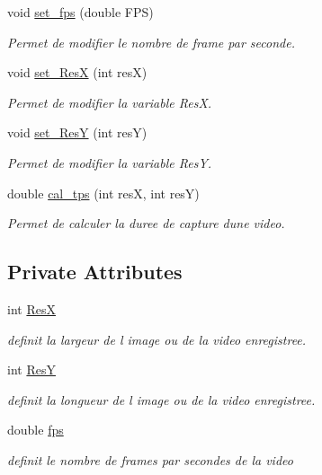 \begin{DoxyCompactItemize}
void \hyperlink{classCapture_a16b9a470b73f5ff71e133ceaa861aeca}{set\+\_\+fps} (double F\+PS)
\begin{DoxyCompactList}\small\item\em Permet de modifier le nombre de frame par seconde. \end{DoxyCompactList}\item 
void \hyperlink{classCapture_ac521361beb13f870b235df51b02e4129}{set\+\_\+\+ResX} (int resX)
\begin{DoxyCompactList}\small\item\em Permet de modifier la variable ResX. \end{DoxyCompactList}\item 
void \hyperlink{classCapture_a7f70eda8e57772e14d04cd55e116ee77}{set\+\_\+\+ResY} (int resY)
\begin{DoxyCompactList}\small\item\em Permet de modifier la variable ResY. \end{DoxyCompactList}\item 
double \hyperlink{classCapture_a9ebad63e310f50a14a9ef2e08254a5c6}{cal\+\_\+tps} (int resX, int resY)
\begin{DoxyCompactList}\small\item\em Permet de calculer la duree de capture d\textquotesingle{}une video. \end{DoxyCompactList}\end{DoxyCompactItemize}
\subsection*{Private Attributes}
\begin{DoxyCompactItemize}
\item 
int \hyperlink{classCapture_aa210af994a7df17b80392adc91103b7f}{ResX}
\begin{DoxyCompactList}\small\item\em definit la largeur de l image ou de la video enregistree. \end{DoxyCompactList}\item 
int \hyperlink{classCapture_a5075c034c091f4c0ab84ddc10b56cd6c}{ResY}
\begin{DoxyCompactList}\small\item\em definit la longueur de l image ou de la video enregistree. \end{DoxyCompactList}\item 
double \hyperlink{classCapture_a295749772bc738a4f2f0a6c6976474d1}{fps}
\begin{DoxyCompactList}\small\item\em definit le nombre de frames par secondes de la video \end{DoxyCompactList}\end{DoxyCompactItemize}


